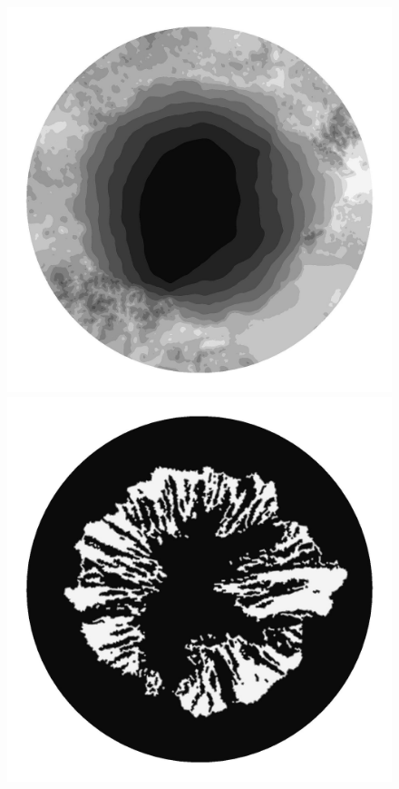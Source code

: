 \begin{figure}
  \centering
  
  \begin{minipage}[b]{0.30\linewidth}
    \includegraphics[width=1.0\textwidth]{images/EISMINT_II/H/S_20000.jpg}
  \end{minipage}
  \quad
  \begin{minipage}[b]{0.30\linewidth}
    \includegraphics[width=1.0\textwidth]{images/EISMINT_II/H/beta_20000.jpg}

\end{minipage}
\end{figure}
